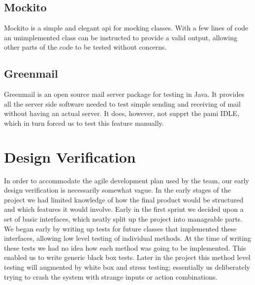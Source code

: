 \subsection{Mockito}
Mockito is a simple and elegant \gls{api} for mocking classes. With a few lines of code an unimplemented class can be instructed to provide a valid output, allowing other parts of the code to be tested without concerns.

\subsection{Greenmail}
Greenmail is an open source mail server package for testing in Java. It provides all the server side software needed to test simple sending and receiving of mail without having an actual server. 
It does, however, not supprt the \gls{pami} IDLE, which in turn forced us to test this feature manually.

\section{Design Verification}
In order to accommodate the agile development plan used by the team, our early design verification is necessarily somewhat vague. In the early stages of the project we had limited knowledge of how the final product would be structured and which features it would involve.
\newline
\newline
Early in the first sprint we decided upon a set of basic interfaces, which neatly split up the project into manageable parts. We began early by writing up tests for future classes that implemented these interfaces, allowing low level testing of individual methods. At the time of writing these tests we had no idea how each method was going to be implemented. This enabled us to write generic black box tests.
\newline
\newline
Later in the project this method level testing will augmented by white box and stress testing; essentially us deliberately trying to crash the system with strange inputs or action combinations. 

